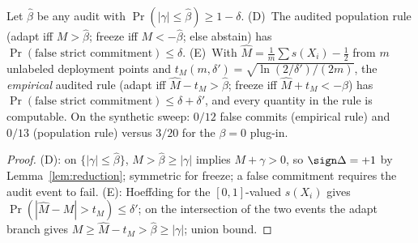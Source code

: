 \begin{theorem}\label{thm:short-audDE}\label{thm:aud-DE}
Let $\widehat\beta$ be any audit with $\Pr(|\gamma|\le\widehat\beta)\ge1-\delta$.
\textup{(D)}~The audited population rule (adapt iff $M>\widehat\beta$; freeze iff
$M<-\widehat\beta$; else abstain) has $\Pr(\text{false strict commitment})\le\delta$.
\textup{(E)}~With $\widehat M=\tfrac1m\sum s(X_i)-\tfrac12$ from $m$ unlabeled deployment
points and $t_M(m,\delta')=\sqrt{\ln(2/\delta')/(2m)}$, the \emph{empirical} audited rule
(adapt iff $\widehat M-t_M>\widehat\beta$; freeze iff $\widehat M+t_M<-\widehat\beta$) has
$\Pr(\text{false strict commitment})\le\delta+\delta'$, and every quantity in the rule is
computable. On the synthetic sweep: $0/12$ false commits (empirical rule) and $0/13$
(population rule) versus $3/20$ for the $\beta{=}0$ plug-in.
\end{theorem}
\begin{proof}
\textup{(D)}: on $\{|\gamma|\le\widehat\beta\}$, $M>\widehat\beta\ge|\gamma|$ implies
$M+\gamma>0$, so $\sign\Delta=+1$ by Lemma~\ref{lem:reduction}; symmetric for freeze; a false
commitment requires the audit event to fail.
\textup{(E)}: Hoeffding for the $[0,1]$-valued $s(X_i)$ gives
$\Pr(|\widehat M-M|>t_M)\le\delta'$; on the intersection of the two events the adapt branch gives
$M\ge\widehat M-t_M>\widehat\beta\ge|\gamma|$; union bound.
\end{proof}


